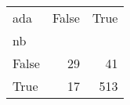\begin{tabular}{lrr}
\toprule
ada &  False &  True  \\
nb    &        &        \\
\midrule
False &     29 &     41 \\
True  &     17 &    513 \\
\bottomrule
\end{tabular}
